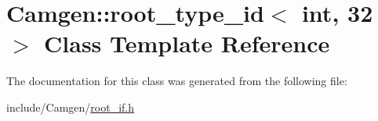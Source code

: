 \hypertarget{a00477}{\section{Camgen\-:\-:root\-\_\-type\-\_\-id$<$ int, 32 $>$ Class Template Reference}
\label{a00477}
}


The documentation for this class was generated from the following file\-:\begin{DoxyCompactItemize}
\item 
include/\-Camgen/\hyperlink{a00732}{root\-\_\-if.\-h}\end{DoxyCompactItemize}
